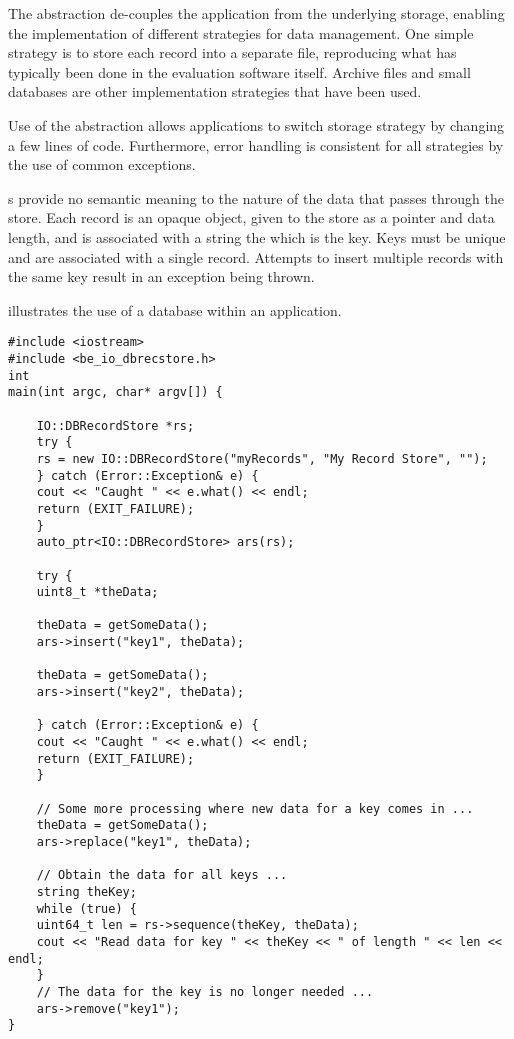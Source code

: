 The  abstraction de-couples the application from
the underlying storage, enabling the implementation of different strategies for
data management. One simple strategy is to store each record into a separate
file, reproducing what has typically been done in the evaluation software
itself. Archive files and small databases are other implementation strategies
that have been used.

Use of the  abstraction allows applications to switch
storage strategy by changing a few lines of code. Furthermore, error handling
is consistent for all strategies by the use of common exceptions.

s provide no semantic meaning to the nature of the data that passes
through the store. Each record is an opaque object, given to the store as a
pointer and data length, and is associated with a string the which is the key.
Keys must
be unique and are associated with a single record. Attempts to insert multiple
records with the same key result in an exception being thrown.

 illustrates the use of a database
 within an application.

\begin{lstlisting}[caption={Using a \class{RecordStore}}, label=lst:recordstoreuse]
#include <iostream>
#include <be_io_dbrecstore.h>
int
main(int argc, char* argv[]) {

    IO::DBRecordStore *rs;
    try {
	rs = new IO::DBRecordStore("myRecords", "My Record Store", "");
    } catch (Error::Exception& e) {
	cout << "Caught " << e.what() << endl;
	return (EXIT_FAILURE);
    }
    auto_ptr<IO::DBRecordStore> ars(rs);

    try {
	uint8_t *theData;

	theData = getSomeData();
	ars->insert("key1", theData);

	theData = getSomeData();
	ars->insert("key2", theData);

    } catch (Error::Exception& e) {
	cout << "Caught " << e.what() << endl;
	return (EXIT_FAILURE);
    }

    // Some more processing where new data for a key comes in ...
    theData = getSomeData();
    ars->replace("key1", theData);
  
    // Obtain the data for all keys ...
    string theKey;
    while (true) {
	uint64_t len = rs->sequence(theKey, theData);
	cout << "Read data for key " << theKey << " of length " << len << endl;
    }
    // The data for the key is no longer needed ...
    ars->remove("key1");
}
\end{lstlisting}

